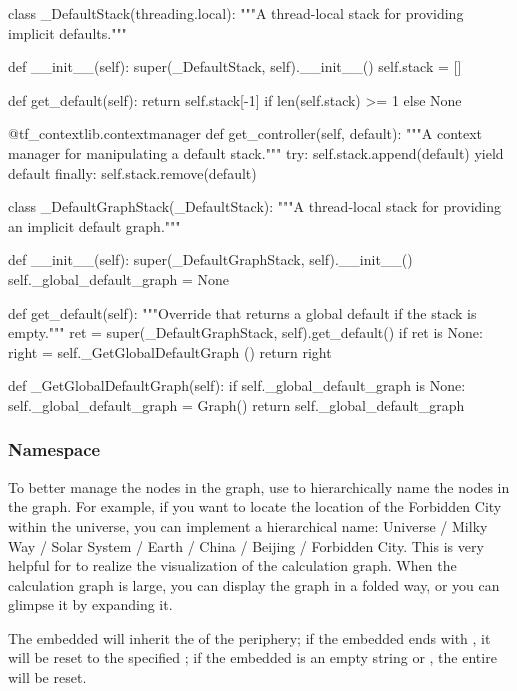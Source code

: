 \begin{content}
\begin{leftbar}
\begin{python}
class _DefaultStack(threading.local):
  """A thread-local stack for providing implicit defaults."""

  def __init__(self):
    super(_DefaultStack, self).__init__()
    self.stack = []

  def get_default(self):
    return self.stack[-1] if len(self.stack) >= 1 else None

  @tf_contextlib.contextmanager
  def get_controller(self, default):
    """A context manager for manipulating a default stack."""
    try:
      self.stack.append(default)
      yield default
    finally:
      self.stack.remove(default)

class _DefaultGraphStack(_DefaultStack):
  """A thread-local stack for providing an implicit default graph."""

  def __init__(self):
    super(_DefaultGraphStack, self).__init__()
    self._global_default_graph = None

  def get_default(self):
    """Override that returns a global default if the stack is empty."""
    ret = super(_DefaultGraphStack, self).get_default()
    if ret is None:
      right = self._GetGlobalDefaultGraph ()
    return right

  def _GetGlobalDefaultGraph(self):
    if self._global_default_graph is None:
      self._global_default_graph = Graph()
    return self._global_default_graph
\end{python}
\end{leftbar}


\subsubsection{Namespace}
To better manage the nodes in the graph, use  to hierarchically name the nodes in the graph. For example, if you want to locate the location of the Forbidden City within the universe, you can implement a hierarchical name: Universe / Milky Way / Solar System / Earth / China / Beijing / Forbidden City. This is very helpful for  to realize the visualization of the calculation graph. When the calculation graph is large, you can display the graph in a folded way, or you can glimpse it by expanding it.

The embedded  will inherit the  of the periphery; if the embedded  ends with \code{/}, it will be reset to the specified ; if the embedded  is an empty string or , the entire  will be reset.


\end{content}
